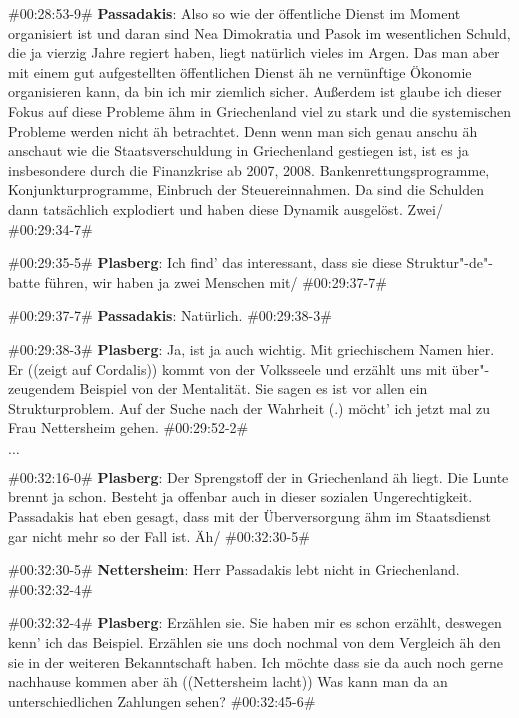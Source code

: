 \begin{description}
\begin{linenumbers}[1]
		\item \#00:28:53-9\# \textbf{Passadakis}: Also so wie der öffentliche Dienst im Moment organisiert ist und daran sind Nea Dimokratia und Pasok im wesentlichen Schuld, die ja vierzig Jahre regiert haben, liegt natürlich vieles im Argen. Das man aber mit einem gut aufgestellten öffentlichen Dienst äh ne vernünftige Ökonomie organisieren kann, da bin ich mir ziemlich sicher. Außerdem ist glaube ich dieser Fokus auf diese Probleme ähm in Griechenland viel zu stark und die systemischen Probleme werden nicht äh betrachtet. Denn wenn man sich genau anschu äh anschaut wie die Staatsverschuldung in Griechenland gestiegen ist, ist es ja insbesondere durch die Finanzkrise ab 2007, 2008. Bankenrettungsprogramme, Konjunkturprogramme, Einbruch der Steuereinnahmen. Da sind die Schulden dann tatsächlich explodiert und haben diese Dynamik ausgelöst. Zwei/  \#00:29:34-7\# 
		
		\item \#00:29:35-5\# \textbf{Plasberg}: Ich find' das interessant, dass sie diese Struktur"-de"-batte führen, wir haben ja zwei Menschen mit/ \#00:29:37-7\#
		
		\item \#00:29:37-7\# \textbf{Passadakis}: Natürlich. \#00:29:38-3\#
		
		\item \#00:29:38-3\# \textbf{Plasberg}: Ja, ist ja auch wichtig. Mit griechischem Namen hier. Er ((zeigt auf Cordalis)) kommt von der Volksseele und erzählt uns mit über"-zeugendem Beispiel von der Mentalität. Sie sagen es ist vor allen ein Strukturproblem. Auf der Suche nach der Wahrheit (.) möcht' ich jetzt mal zu Frau Nettersheim gehen. \#00:29:52-2\#
		
		\item $\ldots$
		
		\item \#00:32:16-0\# \textbf{Plasberg}: Der Sprengstoff der in Griechenland äh liegt. Die Lunte brennt ja schon. Besteht ja offenbar auch in dieser sozialen Ungerechtigkeit. Passadakis hat eben gesagt, dass mit der Überversorgung ähm im Staatsdienst gar nicht mehr so der Fall ist. Äh/ \#00:32:30-5\#
		
		\item \#00:32:30-5\# \textbf{Nettersheim}: Herr Passadakis lebt nicht in Griechenland. \#00:32:32-4\# 
		
		\item \#00:32:32-4\# \textbf{Plasberg}: Erzählen sie. Sie haben mir es schon erzählt, deswegen kenn' ich das Beispiel. Erzählen sie uns doch nochmal von dem Vergleich äh den sie in der weiteren Bekanntschaft haben. Ich möchte dass sie da auch noch gerne nachhause kommen aber äh ((Nettersheim lacht)) Was kann man da an unterschiedlichen Zahlungen sehen? \#00:32:45-6\# 
		

\end{linenumbers}
\end{description}
